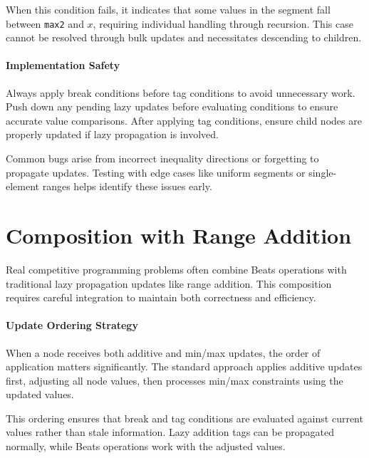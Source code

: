 
When this condition fails, it indicates that some values in the segment fall between \texttt{max2} and $x$, requiring individual handling through recursion. This case cannot be resolved through bulk updates and necessitates descending to children.

\paragraph{Implementation Safety}

Always apply break conditions before tag conditions to avoid unnecessary work. Push down any pending lazy updates before evaluating conditions to ensure accurate value comparisons. After applying tag conditions, ensure child nodes are properly updated if lazy propagation is involved.

Common bugs arise from incorrect inequality directions or forgetting to propagate updates. Testing with edge cases like uniform segments or single-element ranges helps identify these issues early.

\section{Composition with Range Addition}
\label{sec:beats_with_addition}

Real competitive programming problems often combine Beats operations with traditional lazy propagation updates like range addition. This composition requires careful integration to maintain both correctness and efficiency.

\paragraph{Update Ordering Strategy}

When a node receives both additive and min/max updates, the order of application matters significantly. The standard approach applies additive updates first, adjusting all node values, then processes min/max constraints using the updated values.

This ordering ensures that break and tag conditions are evaluated against current values rather than stale information. Lazy addition tags can be propagated normally, while Beats operations work with the adjusted values.

